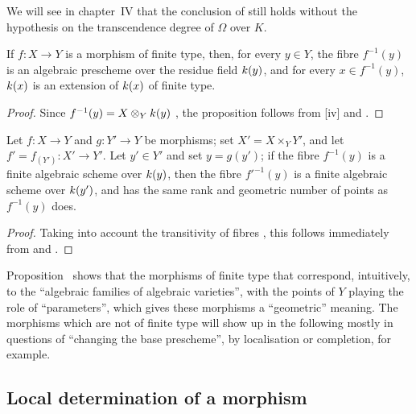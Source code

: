 \begin{rmk}[6.4.10]
\label{1.6.4.10}
We will see in chapter~IV that the conclusion of  still holds without the hypothesis on the transcendence degree of $\Omega$ over $K$.
\end{rmk}

\begin{prop}[6.4.11]
\label{1.6.4.11}
If $f:X\to Y$ is a morphism of finite type, then, for every $y\in Y$, the fibre $f^{-1}(y)$ is an algebraic prescheme over the residue field $k(y)$, and for every $x\in f^{-1}(y)$, $k(x)$ is an extension of $k(x)$ of finite type.
\end{prop}

\begin{proof}
\label{proof-1.6.4.11}
Since $f^{-1}(y)=X\otimes_Yk(y)$ , the proposition follows from [iv] and .
\end{proof}

\begin{prop}[6.4.12]
\label{1.6.4.12}
Let $f:X\to Y$ and $g:Y'\to Y$ be morphisms;
set $X'=X\times_Y Y'$, and let $f'=f_{(Y')}:X'\to Y'$.
Let $y'\in Y'$ and set $y=g(y')$;
if the fibre $f^{-1}(y)$ is a finite algebraic scheme over $k(y)$, then the fibre $f'^{-1}(y)$ is a finite algebraic scheme over $k(y')$, and has the same rank and geometric number of points as $f^{-1}(y)$ does.
\end{prop}

\begin{proof}
\label{proof-1.6.4.12}
Taking into account the transitivity of fibres , this follows immediately from  and .
\end{proof}

\begin{env}[6.4.13]
\label{1.6.4.13}
Proposition~ shows that the morphisms of finite type that correspond, intuitively, to the ``algebraic families of algebraic varieties'', with the points of $Y$ playing the role of ``parameters'', which gives these morphisms a ``geometric'' meaning.
The morphisms which are not of finite type will show up in the following mostly in questions of ``changing the base prescheme'', by localisation or completion, for example.
\end{env}

\subsection{Local determination of a morphism}

